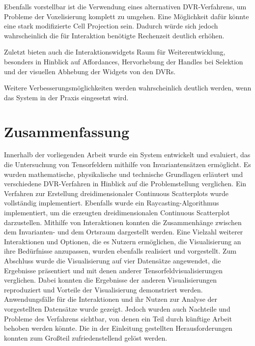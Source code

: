 \documentclass[a4paper,fontsize=12pt,toc=bib,parskip=half,ngerman]{scrartcl}
\begin{document}
Ebenfalls vorstellbar ist die Verwendung eines alternativen DVR-Verfahrens, um Probleme der Voxelisierung komplett zu umgehen. Eine M\"oglichkeit daf\"ur k\"onnte eine stark modifizierte Cell Projection sein. Dadurch w\"urde sich jedoch wahrscheinlich die f\"ur Interaktion ben\"otigte Rechenzeit deutlich erh\"ohen.

Zuletzt bieten auch die Interaktionswidgets Raum f\"ur Weiterentwicklung, besonders in Hinblick auf Affordances, Hervorhebung der Handles bei Selektion und der visuellen Abhebung der Widgets von den DVRs.
 
Weitere Verbesserungsm\"oglichkeiten werden wahrscheinlich deutlich werden, wenn das System in der Praxis eingesetzt wird. 

\section{Zusammenfassung}
\label{sec:Zusammenfassung}
Innerhalb der vorliegenden Arbeit wurde ein System entwickelt und evaluiert, das die Untersuchung von Tensorfeldern mithilfe von Invariantens\"atzen erm\"oglicht. Es wurden mathematische, physikalische und technische Grundlagen erl\"autert und verschiedene DVR-Verfahren in Hinblick auf die Problemstellung verglichen. Ein Verfahren zur Erstellung dreidimensionaler Continuous Scatterplots wurde vollst\"andig implementiert. Ebenfalls wurde ein Raycasting-Algorithmus implementiert, um die erzeugten dreidimensionalen Continuous Scatterplot darzustellen. Mithilfe von Interaktionen konnten die Zusammenhänge zwischen dem Invarianten- und dem Ortsraum dargestellt werden. Eine Vielzahl weiterer Interaktionen und Optionen, die es Nutzern erm\"oglichen, die Visualisierung an ihre Bed\"urfnisse anzupassen, wurden ebenfalls realisiert und vorgestellt. Zum Abschluss wurde die Visualisierung auf vier Datens\"atze angewendet, die Ergebnisse pr\"asentiert und mit denen anderer Tensorfeldvisualisierungen verglichen. Dabei konnten die Ergebnisse der anderen Visualisierungen reproduziert und Vorteile der Visualisierung demonstriert werden. Anwendungsf\"alle f\"ur die Interaktionen und ihr Nutzen zur Analyse der vorgestellten Datens\"atze wurde gezeigt. Jedoch wurden auch Nachteile und Probleme des Verfahrens sichtbar, von denen ein Teil durch k\"unftige Arbeit behoben werden k\"onnte. Die in der Einleitung gestellten Herausforderungen konnten zum Gro{\ss}teil zufriedenstellend gel\"ost werden.

\end{document}

